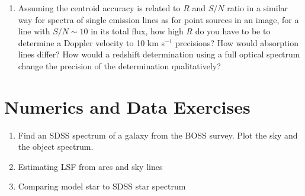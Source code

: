 \begin{enumerate} 
\item Assuming the centroid accuracy is related to $R$ and $S/N$ ratio
    in a similar way for spectra of single emission lines as for point
    sources in an image, for a line with $S/N \sim 10$ in its total
    flux, how high $R$ do you have to be to determine a Doppler
    velocity to 10 km s$^{-1}$ precisions? How would absorption lines
    differ? How would a redshift determination using a full optical
    spectrum change the precision of the determination qualitatively?
\end{enumerate} 



\section{Numerics and Data Exercises}

\begin{enumerate}
\item Find an SDSS spectrum of a galaxy from the BOSS survey. Plot the
    sky and the object spectrum. 
\item Estimating LSF from arcs and sky lines
\item Comparing model star to SDSS star spectrum
\end{enumerate}


  
